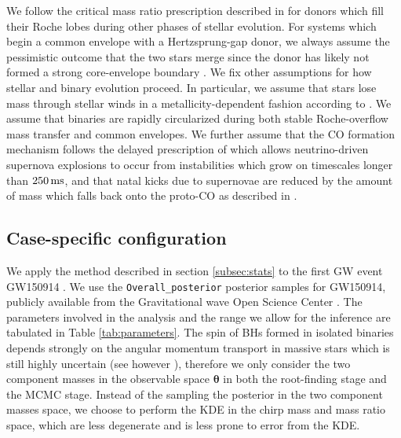 \documentclass[linenumbers,twocolumn]{aastex631}
\begin{document}
We follow the critical mass ratio prescription 
described in \cite{Neijssel2019} for donors which fill their Roche lobes during
 other phases of stellar evolution.
For systems which begin a common envelope 
with a Hertzsprung-gap donor, we always assume the pessimistic outcome that the two 
stars merge since the donor has likely not formed a strong core-envelope boundary 
\citep{Ivanova2004, Belczynski2008}. We fix other assumptions for how stellar and binary 
evolution proceed. In particular, we assume that stars lose mass through stellar winds 
in a metallicity-dependent 
fashion according to \cite{Vink2001,Vink2005}. We assume that binaries are rapidly circularized
during both stable Roche-overflow mass transfer and common envelopes.
We further assume that the CO formation mechanism follows the delayed 
prescription of \citet{Fryer2012} which allows neutrino-driven supernova explosions to 
occur from instabilities which grow on timescales longer than $250\,\rm{ms}$, 
and that natal kicks due to supernovae are reduced by the amount 
of mass which falls back onto the proto-CO
as described in \citet{Fryer2012}.

\subsection{Case-specific configuration}
\label{subsec:configuration}

We apply the method described in section \ref{subsec:stats} to the
first GW event GW150914 \citep{GW150914}. We use the \texttt{Overall\_posterior}
posterior samples for GW150914, publicly available from the Gravitational wave
Open Science Center \citep{LIGOScientific:2019lzm}. The parameters involved in
the analysis and the range we allow for the inference are tabulated in Table
\ref{tab:parameters}. The spin of BHs formed in isolated binaries depends
strongly on the angular momentum transport in massive stars which is still
highly uncertain (see however \citet{Fuller2019, Bavera2020}), therefore we only
consider the two component masses in the observable space $\bm{\theta}$ in both
the root-finding stage and the MCMC stage. Instead of the sampling the posterior
in the two component masses space, we choose to perform the KDE in the chirp
mass and mass ratio space, which are less degenerate and is less prone to error
from the KDE.
\end{document}
